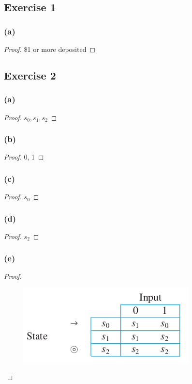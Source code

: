 \documentclass[14pt]{extarticle}
\begin{document}
\subsection{Exercise 1}

\subsubsection{(a)}

\begin{proof}
\$1 or more deposited
\end{proof}

\subsection{Exercise 2}

\subsubsection{(a)}

\begin{proof}
\(s_0, s_1, s_2\)
\end{proof}

\subsubsection{(b)}

\begin{proof}
0, 1
\end{proof}

\subsubsection{(c)}

\begin{proof}
\(s_0\)
\end{proof}

\subsubsection{(d)}

\begin{proof}
\(s_2\)
\end{proof}

\subsubsection{(e)}

\begin{proof}
\begin{figure}[ht!]
\centering
\includegraphics[scale=0.5]{../images/12.2.2.e.png}
\end{figure}
\end{proof}
\end{document}
